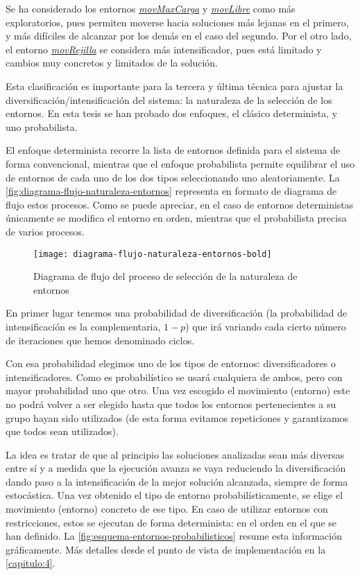 Se ha considerado los entornos \hyperref[entorno:movMaxCarga]{\textit{movMaxCarga}} y \hyperref[entorno:movLibre]{\textit{movLibre}} como más exploratorios, pues permiten moverse hacia soluciones más lejanas en el primero, y más difíciles de alcanzar por los demás en el caso del segundo. Por el otro lado, el entorno \hyperref[entorno:movRejilla]{\textit{movRejilla}} se considera más intensificador, pues está limitado y cambios muy concretos y limitados de la solución.

Esta clasificación es importante para la tercera y última técnica para ajustar la diversificación/intensificación del sistema: la naturaleza de la selección de los entornos. En esta tesis se han probado dos enfoques, el clásico determinista, y uno probabilista.

El enfoque determinista recorre la lista de entornos definida para el sistema de forma convencional, mientras que el enfoque probabilista permite equilibrar el uso de entornos de cada uno de los dos tipos seleccionando uno aleatoriamente. La \autoref{fig:diagrama-flujo-naturaleza-entornos} representa en formato de diagrama de flujo estos procesos. Como se puede apreciar, en el caso de entornos deterministas únicamente se modifica el entorno en orden, mientras que el probabilista precisa de varios procesos.

\begin{figure}
    \centering    \texttt{[image: diagrama-flujo-naturaleza-entornos-bold]}
    \caption{Diagrama de flujo del proceso de selección de la naturaleza de entornos}
    \label{fig:diagrama-flujo-naturaleza-entornos}
\end{figure}

En primer lugar tenemos una probabilidad de diversificación (la probabilidad de intensificación es la complementaria, $1-p$) que irá variando cada cierto número de iteraciones que hemos denominado ciclos.

Con esa probabilidad elegimos uno de los tipos de entornos: diversificadores o intensificadores. Como es probabilístico se usará cualquiera de ambos, pero con mayor probabilidad uno que otro. Una vez escogido el movimiento (entorno) este no podrá volver a ser elegido hasta que todos los entornos pertenecientes a su grupo hayan sido utilizados (de esta forma evitamos repeticiones y garantizamos que todos sean utilizados).

La idea es tratar de que al principio las soluciones analizadas sean más diversas entre sí y a medida que la ejecución avanza se vaya reduciendo la diversificación dando paso a la intensificación de la mejor solución alcanzada, siempre de forma estocástica. Una vez obtenido el tipo de entorno probabilísticamente, se elige el movimiento (entorno) concreto de ese tipo. En caso de utilizar entornos con restricciones, estos se ejecutan de forma determinista: en el orden en el que se han definido. La \autoref{fig:esquema-entornos-probabilisticos} resume esta información gráficamente. Más detalles desde el punto de vista de implementación en la \autoref{capitulo:4}. %

